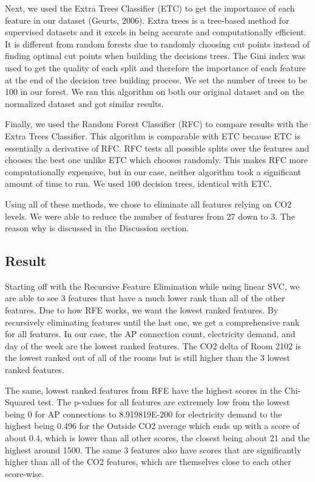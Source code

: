 \documentclass[letterpaper, 12 pt, conference]{ieeeconf}  %
\begin{document}
Next, we used the Extra Trees Classifier (ETC) to get the importance of each feature in our dataset (Geurts, 2006). Extra trees is a tree-based method for supervised datasets and it excels in being accurate and computationally efficient. It is different from random forests due to randomly choosing cut points instead of finding optimal cut points when building the decisions trees. The Gini index was used to get the quality of each split and therefore the importance of each feature at the end of the decision tree building process. We set the number of trees to be 100 in our forest. We ran this algorithm on both our original dataset and on the normalized dataset and got similar results.
        
Finally, we used the Random Forest Classifier (RFC) to compare results with the Extra Trees Classifier. This algorithm is comparable with ETC because ETC is essentially a derivative of RFC. RFC tests all possible splits over the features and chooses the best one unlike ETC which chooses randomly. This makes RFC more computationally expensive, but in our case, neither algorithm took a significant amount of time to run. We used 100 decision trees, identical with ETC.
        
Using all of these methods, we chose to eliminate all features relying on CO2 levels. We were able to reduce the number of features from 27 down to 3. The reason why is discussed in the Discussion section.


\subsection{Result}

Starting off with the Recursive Feature Elimination while using linear SVC, we are able to see 3 features that have a much lower rank than all of the other features. Due to how RFE works, we want the lowest ranked features. By recursively eliminating features until the last one, we get a comprehensive rank for all features. In our case, the AP connection count, electricity demand, and day of the week are the lowest ranked features. The CO2 delta of Room 2102 is the lowest ranked out of all of the rooms but is still higher than the 3 lowest ranked features.

The same, lowest ranked features from RFE have the highest scores in the Chi-Squared test. The p-values for all features are extremely low from the lowest being 0 for AP connections to 8.919819E-200 for electricity demand to the highest being 0.496 for the Outside CO2 average which ends up with a score of about 0.4, which is lower than all other scores, the closest being about 21 and the highest around 1500. The same 3 features also have scores that are significantly higher than all of the CO2 features, which are themselves close to each other score-wise.
\end{document}
